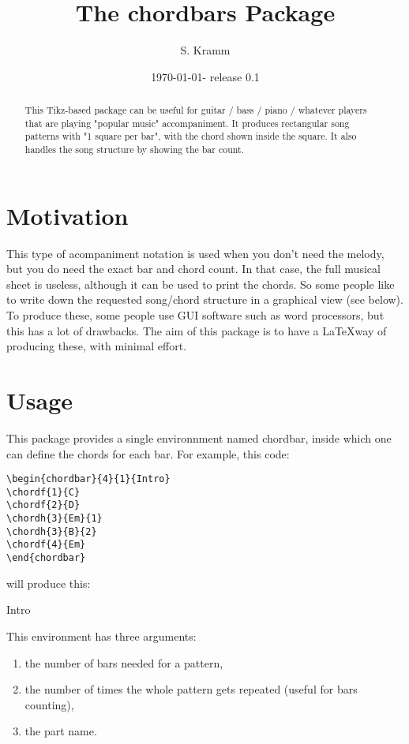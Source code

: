 \documentclass[11pt]{article}
\title{The chordbars Package}
\author{S. Kramm}
\date{\today - release 0.1}
\begin{document}
\maketitle

\begin{abstract}
This Tikz-based package can be useful for guitar / bass / piano / whatever players that are playing "popular music" accompaniment.
It produces rectangular song patterns with "1 square per bar", with the chord shown inside the square.
It also handles the song structure by showing the bar count.
\end{abstract}

\section{Motivation}

This type of acompaniment notation is used when you don't need the melody, but you do need the exact bar and chord count.
In that case, the full musical sheet is useless, although it can be used to print the chords.
So some people like to write down the requested song/chord structure in a graphical view (see below). To produce these, some people use GUI software such as word processors, but this has a lot of drawbacks.
The aim of this package is to have a \LaTeX way of producing these, with minimal effort.


\section{Usage}
This package provides a single environnment named {\ttfamily chordbar}, inside which one can define the chords for each bar.
For example, this code:

\begin{lstlisting}
\begin{chordbar}{4}{1}{Intro}
\chordf{1}{C}
\chordf{2}{D}
\chordh{3}{Em}{1}
\chordh{3}{B}{2}
\chordf{4}{Em}
\end{chordbar}
\end{lstlisting}

will produce this:

\begin{chordbar}{4}{1}{Intro}
\end{chordbar}


This environment has three arguments:
\begin{enumerate}
\item the number of bars needed for a pattern,
\item the number of times the whole pattern gets repeated (useful for bars counting),
\item the part name.
\end{enumerate}
\end{document}
